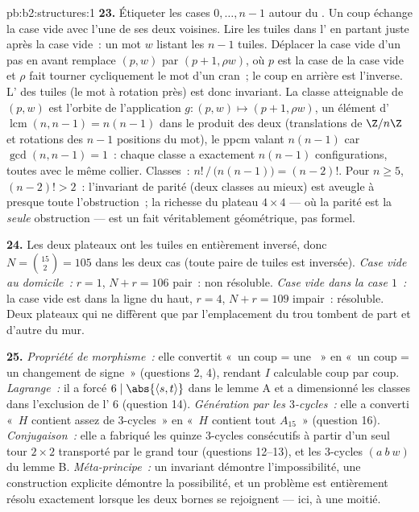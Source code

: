 \begin{solution}{pb:b2:structures:1}
\textbf{23.} Étiqueter les cases $0, \dots, n-1$ autour du .
Un coup échange la case vide avec l'une de ses deux voisines. Lire
les tuiles dans l'  en partant juste après la case
vide~: un mot $w$ listant les $n - 1$ tuiles. Déplacer la case vide
d'un pas en avant remplace $(p, w)$ par $(p + 1, \rho w)$, où $p$ est
la case de la case vide et $\rho$ fait tourner cycliquement le mot
d'un cran~; le coup en arrière est l'inverse. L' \emph{}
des tuiles (le mot à rotation près) est donc invariant. La classe
atteignable de $(p, w)$ est l'orbite de l'application $g \colon (p, w)
\mapsto (p+1, \rho w)$, un élément d' $\operatorname{lcm}(n, n-1)
= n(n-1)$ dans le produit des deux  (translations de
$\Z/n\Z$ et rotations des $n-1$ positions du mot), le ppcm valant
$n(n-1)$ car $\gcd(n, n-1) = 1$~: chaque classe a exactement $n(n-1)$
configurations, toutes avec le même collier. Classes~:
$n!\,/\,\bigl(n(n-1)\bigr) = (n-2)!$. Pour $n \geq 5$,
$(n-2)! > 2$~: l'invariant de parité (deux classes au mieux) est
aveugle à presque toute l'obstruction~; la richesse du plateau $4
\times 4$ --- où la parité est la \emph{seule} obstruction --- est
un fait véritablement géométrique, pas formel.

\textbf{24.} Les deux plateaux ont les tuiles en  entièrement
inversé, donc $N = \binom{15}{2} = 105$ dans les deux cas (toute
paire de tuiles est inversée). \emph{Case vide au domicile~:} $r = 1$,
$N + r = 106$ pair~: non résoluble. \emph{Case vide dans la case
$1$~:} la case vide est dans la ligne du haut, $r = 4$, $N + r = 109$
impair~: résoluble. Deux plateaux qui ne diffèrent que par
l'emplacement du trou tombent de part et d'autre du mur.

\textbf{25.} \emph{Propriété de morphisme~:} elle convertit «~un coup
= une ~» en «~un coup = un changement de signe~»
(questions 2, 4), rendant $I$ calculable coup par coup.
\emph{Lagrange~:} il a forcé $6 \mid \abs{\langle s, t\rangle}$ dans
le lemme A et a dimensionné les classes dans l'exclusion de l'
$6$ (question 14). \emph{Génération par les $3$-cycles~:} elle a
converti «~$H$ contient assez de $3$-cycles~» en «~$H$ contient tout
$A_{15}$~» (question 16). \emph{Conjugaison~:} elle a fabriqué les
quinze $3$-cycles consécutifs à partir d'un seul tour $2 \times 2$
transporté par le grand tour (questions 12--13), et les $3$-cycles
$(a\ b\ w)$ du lemme B. \emph{Méta-principe~:} un invariant démontre
l'impossibilité, une construction explicite démontre la possibilité,
et un problème est entièrement résolu exactement lorsque les deux
bornes se rejoignent --- ici, à une moitié.
\end{solution}

